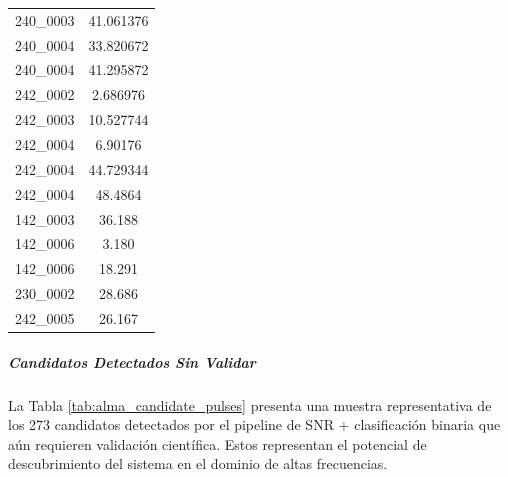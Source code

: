\begin{table}[H]
\begin{tabular}{|c|c|}
        240\_0003 & 41.061376 \\
        240\_0004 & 33.820672 \\
        240\_0004 & 41.295872 \\
        242\_0002 & 2.686976 \\
        242\_0003 & 10.527744 \\
        242\_0004 & 6.90176 \\
        242\_0004 & 44.729344 \\
        242\_0004 & 48.4864 \\
        142\_0003 & 36.188 \\
        142\_0006 & 3.180 \\
        142\_0006 & 18.291 \\
        230\_0002 & 28.686 \\
        242\_0005 & 26.167 \\
        \hline
    \end{tabular}
\end{table}

\subparagraph{Candidatos Detectados Sin Validar}

La Tabla \ref{tab:alma_candidate_pulses} presenta una muestra representativa de los 273 candidatos detectados por el pipeline de SNR + clasificación binaria que aún requieren validación científica. Estos representan el potencial de descubrimiento del sistema en el dominio de altas frecuencias.

